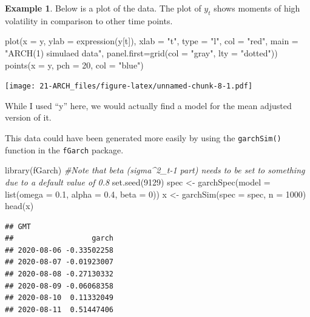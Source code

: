 \documentclass[
]{book}
\newenvironment{Shaded}{\begin{snugshade}}{\end{snugshade}}
\newcommand{\AttributeTok}[1]{\textcolor[rgb]{0.77,0.63,0.00}{#1}}
\newcommand{\CommentTok}[1]{\textcolor[rgb]{0.56,0.35,0.01}{\textit{#1}}}
\newcommand{\DecValTok}[1]{\textcolor[rgb]{0.00,0.00,0.81}{#1}}
\newcommand{\FloatTok}[1]{\textcolor[rgb]{0.00,0.00,0.81}{#1}}
\newcommand{\FunctionTok}[1]{\textcolor[rgb]{0.00,0.00,0.00}{#1}}
\newcommand{\NormalTok}[1]{#1}
\newcommand{\OtherTok}[1]{\textcolor[rgb]{0.56,0.35,0.01}{#1}}
\newcommand{\StringTok}[1]{\textcolor[rgb]{0.31,0.60,0.02}{#1}}
\theoremstyle{definition}
\theoremstyle{definition}
\newtheorem{example}{Example}[chapter]
\theoremstyle{definition}
\theoremstyle{definition}
\theoremstyle{remark}
\begin{document}
\begin{example}
Below is a plot of the data. The plot of \(y_t\) shows moments of high volatility in comparison to other time points.

\begin{Shaded}
\begin{Highlighting}[]
\FunctionTok{plot}\NormalTok{(}\AttributeTok{x =}\NormalTok{ y, }\AttributeTok{ylab =} \FunctionTok{expression}\NormalTok{(y[t]), }\AttributeTok{xlab =} \StringTok{"t"}\NormalTok{, }\AttributeTok{type =} 
    \StringTok{"l"}\NormalTok{, }\AttributeTok{col =} \StringTok{"red"}\NormalTok{,  }\AttributeTok{main =} \StringTok{"ARCH(1) simulaed data"}\NormalTok{, }
    \AttributeTok{panel.first=}\FunctionTok{grid}\NormalTok{(}\AttributeTok{col =} \StringTok{"gray"}\NormalTok{, }\AttributeTok{lty =} \StringTok{"dotted"}\NormalTok{))}
\FunctionTok{points}\NormalTok{(}\AttributeTok{x =}\NormalTok{ y, }\AttributeTok{pch =} \DecValTok{20}\NormalTok{, }\AttributeTok{col =} \StringTok{"blue"}\NormalTok{)}
\end{Highlighting}
\end{Shaded}

\texttt{[image: 21-ARCH\_files/figure-latex/unnamed-chunk-8-1.pdf]}

While I used ``y'' here, we would actually find a model for the mean adjusted version of it.

This data could have been generated more easily by using the \texttt{garchSim()} function in the \texttt{fGarch} package.

\begin{Shaded}
\begin{Highlighting}[]
\FunctionTok{library}\NormalTok{(fGarch)}
\CommentTok{\#Note that beta (sigma\^{}2\_t{-}1 part) needs to be set to something due to a default value of 0.8}
\FunctionTok{set.seed}\NormalTok{(}\DecValTok{9129}\NormalTok{)}
\NormalTok{spec }\OtherTok{\textless{}{-}} \FunctionTok{garchSpec}\NormalTok{(}\AttributeTok{model =} \FunctionTok{list}\NormalTok{(}\AttributeTok{omega =} \FloatTok{0.1}\NormalTok{, }\AttributeTok{alpha =} \FloatTok{0.4}\NormalTok{, }
    \AttributeTok{beta =} \DecValTok{0}\NormalTok{))}
\NormalTok{x }\OtherTok{\textless{}{-}} \FunctionTok{garchSim}\NormalTok{(}\AttributeTok{spec =}\NormalTok{ spec, }\AttributeTok{n =} \DecValTok{1000}\NormalTok{)}
\FunctionTok{head}\NormalTok{(x)}
\end{Highlighting}
\end{Shaded}

\begin{verbatim}
## GMT
##                  garch
## 2020-08-06 -0.33502258
## 2020-08-07 -0.01923007
## 2020-08-08 -0.27130332
## 2020-08-09 -0.06068358
## 2020-08-10  0.11332049
## 2020-08-11  0.51447406
\end{verbatim}


\end{example}
\end{document}
